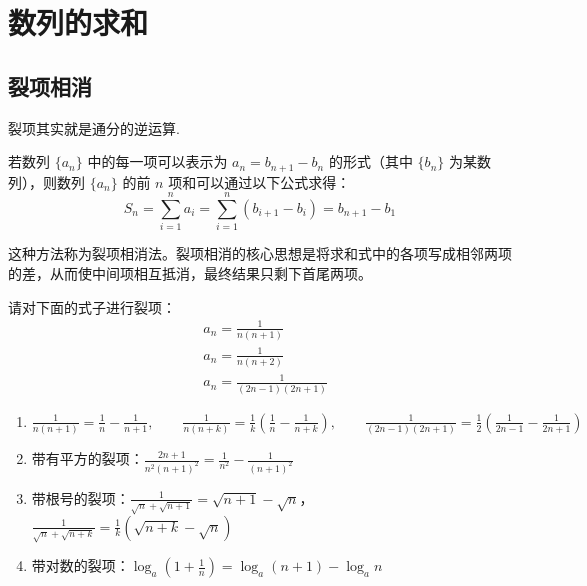 \section{数列的求和}

\subsection{裂项相消}

\begin{definition}[裂项]
    裂项其实就是通分的逆运算.
\end{definition}

\begin{theorem}[裂项相消法]
    若数列 $\{a_n\}$ 中的每一项可以表示为 $a_n = b_{n+1} - b_n$ 的形式（其中 $\{b_n\}$ 为某数列），则数列 $\{a_n\}$ 的前 $n$ 项和可以通过以下公式求得：
    $$S_n = \sum_{i=1}^{n} a_i = \sum_{i=1}^{n} (b_{i+1} - b_i) = b_{n+1} - b_1$$

    这种方法称为裂项相消法。裂项相消的核心思想是将求和式中的各项写成相邻两项的差，从而使中间项相互抵消，最终结果只剩下首尾两项。
\end{theorem}

\begin{example}
    请对下面的式子进行裂项：
    $$
        \begin{aligned}
             & a_n=\frac{1}{n(n+1)}         \\
             & a_n=\frac{1}{n(n+2)}         \\
             & a_n=\frac{1}{(2 n-1)(2 n+1)}
        \end{aligned}
    $$
\end{example}

\begin{theorem}[常用的裂项公式]
    \begin{enumerate}
        \item $\frac{1}{n(n+1)}=\frac{1}{n}-\frac{1}{n+1}, \quad \quad \frac{1}{n(n+k)}=\frac{1}{k}\left(\frac{1}{n}-\frac{1}{n+k}\right), \quad \quad \frac{1}{(2n-1)(2n+1)}=\frac{1}{2}\left(\frac{1}{2n-1}-\frac{1}{2n+1}\right)$

        \item 带有平方的裂项：$\frac{2n+1}{n^2(n+1)^2}=\frac{1}{n^2}-\frac{1}{(n+1)^2}$

        \item 带根号的裂项：$\frac{1}{\sqrt{n}+\sqrt{n+1}}=\sqrt{n+1}-\sqrt{n}$，$\frac{1}{\sqrt{n}+\sqrt{n+k}}=\frac{1}{k}(\sqrt{n+k}-\sqrt{n})$

        \item 带对数的裂项：$\log_a\left(1+\frac{1}{n}\right)=\log_a(n+1)-\log_a n$
    \end{enumerate}
\end{theorem}

